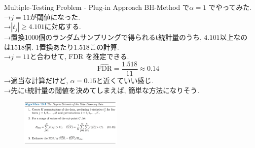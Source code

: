 \documentclass[dvipdfmx,8pt]{beamer}
\begin{document}
  \begin{frame}{Multiple-Testing Problem - Plug-in Approach}
    BH-Method で$\alpha=1$ でやってみた. \\
    →$j=11$が閾値になった. \\
    →$|t_j|\ge 4.101$に対応する. \\
    →置換1000個のランダムサンプリングで得られるt統計量のうち, $4.101$以上なのは$1518$個. 
    1置換あたり$1.518$この計算. \\
    →$j=11$と合わせて, FDR を推定できる. 
    \[
      \hat{\mathrm{FDR}}=\frac{1.518}{11}\approx 0.14
    \]
    →適当な計算だけど, $\alpha=0.15$と近くていい感じ. \\
    →先にt統計量の閾値を決めてしまえば, 簡単な方法になりそう. 
    \begin{figure}
      \centering
      \includegraphics[width=5cm]{./images/plug-in-fdr.png}
    \end{figure}
  \end{frame}
\end{document}
